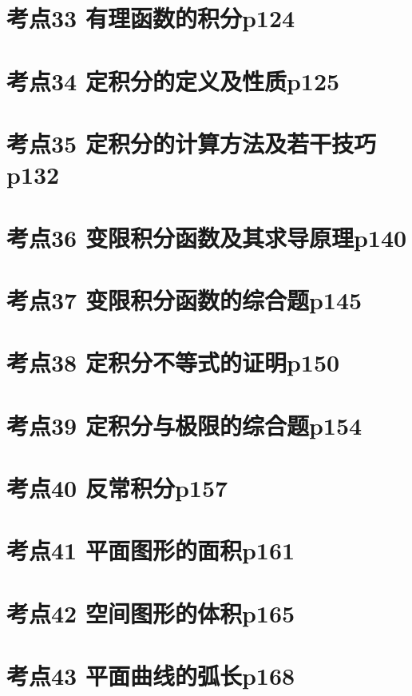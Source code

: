 \section{考点33 有理函数的积分p124}

\section{考点34 定积分的定义及性质p125}

\section{考点35 定积分的计算方法及若干技巧p132}

\section{考点36 变限积分函数及其求导原理p140}

\section{考点37 变限积分函数的综合题p145}

\section{考点38 定积分不等式的证明p150}

\section{考点39 定积分与极限的综合题p154}

\section{考点40 反常积分p157}

\section{考点41 平面图形的面积p161}

\section{考点42 空间图形的体积p165}

\section{考点43 平面曲线的弧长p168}

